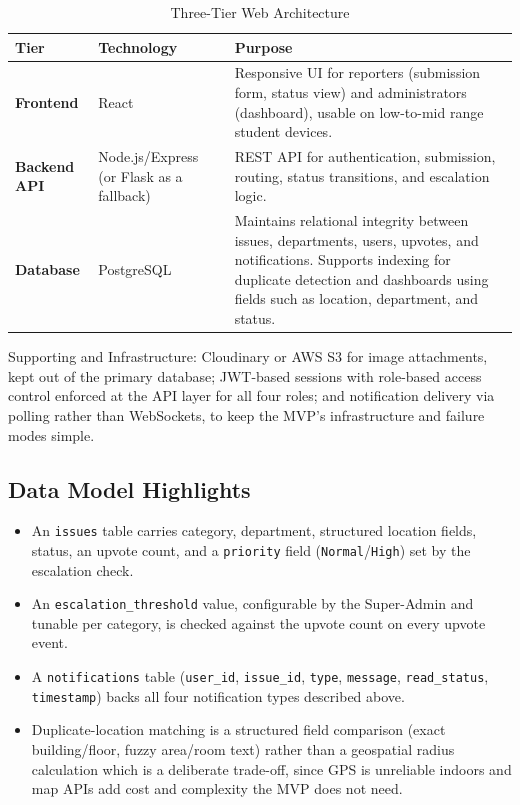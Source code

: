 \documentclass[11pt,a4paper]{article}
\begin{document}
\begin{table}[h]
\centering
\begin{tabular}{|p{2.5cm}|p{4cm}|p{8cm}|}
\hline
\textbf{Tier} & \textbf{Technology} & \textbf{Purpose} \\
\hline
\textbf{Frontend} &
React &
Responsive UI for reporters (submission form, status view) and administrators (dashboard), usable on low-to-mid range student devices. \\
\hline
\textbf{Backend API} &
Node.js/Express (or Flask as a fallback) &
REST API for authentication, submission, routing, status transitions, and escalation logic. \\
\hline
\textbf{Database} &
PostgreSQL &
Maintains relational integrity between issues, departments, users, upvotes, and notifications. Supports indexing for duplicate detection and dashboards using fields such as location, department, and status. \\
\hline
\end{tabular}
\caption{Three-Tier Web Architecture}
\label{tab:web-architecture}
\end{table}

\noindent Supporting and Infrastructure: Cloudinary or AWS S3 for image attachments,
kept out of the primary database; JWT-based sessions with role-based
access control enforced at the API layer for all four roles; and
notification delivery via polling rather than WebSockets, to keep the
MVP's infrastructure and failure modes simple.

\subsection{Data Model Highlights}
\begin{itemize}[leftmargin=0.7cm]
  \item An \texttt{issues} table carries category, department,
    structured location fields, status, an upvote count, and a
    \texttt{priority} field (\texttt{Normal}/\texttt{High}) set by the
    escalation check.
  \item An \texttt{escalation\_threshold} value, configurable by the
    Super-Admin and tunable per category, is checked against the upvote
    count on every upvote event.
  \item A \texttt{notifications} table (\texttt{user\_id},
    \texttt{issue\_id}, \texttt{type}, \texttt{message},
    \texttt{read\_status}, \texttt{timestamp}) backs all four
    notification types described above.
  \item Duplicate-location matching is a structured field comparison
    (exact building/floor, fuzzy area/room text) rather than a
    geospatial radius calculation which is a deliberate trade-off, since GPS
    is unreliable indoors and map APIs add cost and complexity the MVP
    does not need.
\end{itemize}
\end{document}
